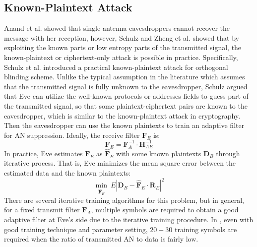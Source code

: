 \subsection{Known-Plaintext Attack}
Anand et al. \cite{anand2012strobe} showed that single antenna eavesdroppers cannot recover the message with her reception, however, Schulz and Zheng et al. \cite{schulz2014practical,zheng2016profiling} showed that by exploiting the known parts or low entropy parts of the transmitted signal, the known-plaintext or ciphertext-only attack is possible in practice. Specifically, Schulz et al. introduced a practical known-plaintext attack for orthogonal blinding scheme. Unlike the typical assumption in the literature which assumes that the transmitted signal is fully unknown to the eavesdropper, Schulz argued that Eve can utilize the well-known protocols or addresses fields to guess part of the transmitted signal, so that some plaintext-ciphertext pairs are known to the eavesdropper, which is similar to the known-plaintext attack in cryptography. Then the eavesdropper can use the known plaintexts to train an adaptive filter for AN suppression. Ideally, the receive filter $\mathbf{F}_E$ is:
\begin{equation}
    \mathbf{F}_E = \mathbf{F}_A^{-1} \cdot \mathbf{H}_{AE}^{-1}
\end{equation}
In practice, Eve estimates $\mathbf{F}_E$ as $\hat{\mathbf{F}}_E$ with some known plaintexts $\mathbf{D}_B$ through iterative process. That is, Eve minimizes the mean square error between the estimated data and the known plaintexts:
\begin{equation}
    \min\limits_{\hat{\mathbf{F}}_E}~ E|\mathbf{D}_B - \hat{\mathbf{F}}_E \cdot \mathbf{R}_E|^2
\end{equation}
There are several iterative training algorithms for this problem, but in general, for a fixed transmit filter $\mathbf{F}_A$, multiple symbols are required to obtain a good adaptive filter at Eve's side due to the iterative training procedure. In \cite{schulz2014practical}, even with good training technique and parameter setting, $20 - 30$ training symbols are required when the ratio of transmitted AN to data is fairly low.